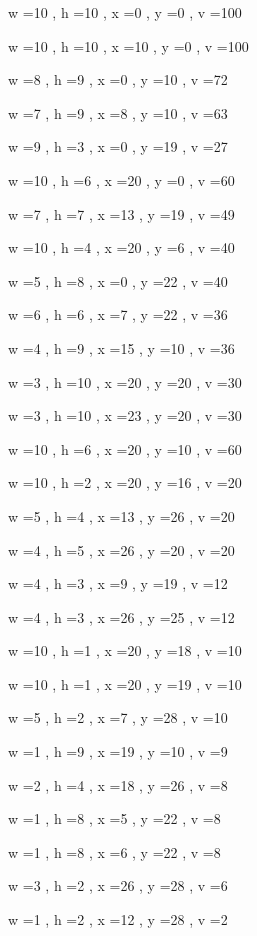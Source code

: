 \documentclass[11pt]{article}
\begin{document}
w =10 , h =10 , x =0 , y =0 , v =100
\par
w =10 , h =10 , x =10 , y =0 , v =100
\par
w =8 , h =9 , x =0 , y =10 , v =72
\par
w =7 , h =9 , x =8 , y =10 , v =63
\par
w =9 , h =3 , x =0 , y =19 , v =27
\par
w =10 , h =6 , x =20 , y =0 , v =60
\par
w =7 , h =7 , x =13 , y =19 , v =49
\par
w =10 , h =4 , x =20 , y =6 , v =40
\par
w =5 , h =8 , x =0 , y =22 , v =40
\par
w =6 , h =6 , x =7 , y =22 , v =36
\par
w =4 , h =9 , x =15 , y =10 , v =36
\par
w =3 , h =10 , x =20 , y =20 , v =30
\par
w =3 , h =10 , x =23 , y =20 , v =30
\par
w =10 , h =6 , x =20 , y =10 , v =60
\par
w =10 , h =2 , x =20 , y =16 , v =20
\par
w =5 , h =4 , x =13 , y =26 , v =20
\par
w =4 , h =5 , x =26 , y =20 , v =20
\par
w =4 , h =3 , x =9 , y =19 , v =12
\par
w =4 , h =3 , x =26 , y =25 , v =12
\par
w =10 , h =1 , x =20 , y =18 , v =10
\par
w =10 , h =1 , x =20 , y =19 , v =10
\par
w =5 , h =2 , x =7 , y =28 , v =10
\par
w =1 , h =9 , x =19 , y =10 , v =9
\par
w =2 , h =4 , x =18 , y =26 , v =8
\par
w =1 , h =8 , x =5 , y =22 , v =8
\par
w =1 , h =8 , x =6 , y =22 , v =8
\par
w =3 , h =2 , x =26 , y =28 , v =6
\par
w =1 , h =2 , x =12 , y =28 , v =2
\par
\newpage


\end{document}
